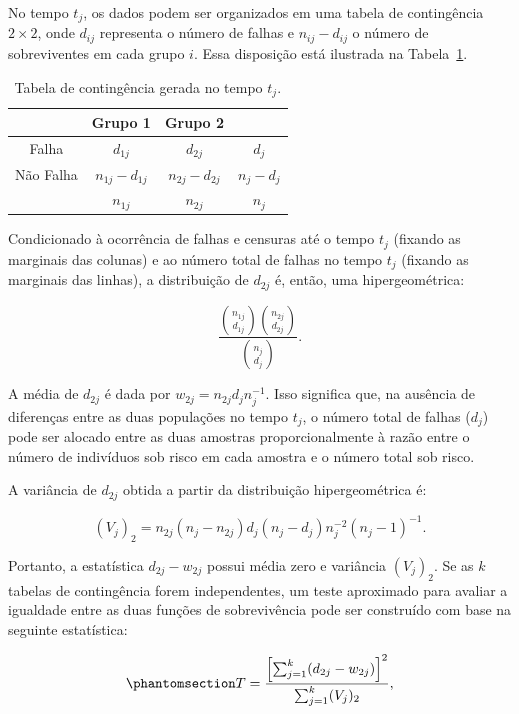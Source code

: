 \documentclass[
  12pt,
  letterpaper,
  DIV=11,
  numbers=noendperiod]{scrreprt}
\begin{document}
No tempo \(t_{j}\), os dados podem ser organizados em uma tabela de
contingência \(2 \times 2\), onde \(d_{ij}\) representa o número de
falhas e \(n_{ij} - d_{ij}\) o número de sobreviventes em cada grupo
\(i\). Essa disposição está ilustrada na
Tabela~\ref{tbl-ExampleTableContig}.

\begin{longtable}[]{@{}cccc@{}}

\caption{\label{tbl-ExampleTableContig}Tabela de contingência gerada no
tempo \(t_{j}\).}

\tabularnewline

\toprule\noalign{}
& Grupo 1 & Grupo 2 & \\
\midrule\noalign{}
\endhead
\bottomrule\noalign{}
\endlastfoot
Falha & \(d_{1j}\) & \(d_{2j}\) & \(d_{j}\) \\
Não Falha & \(n_{1j} - d_{1j}\) & \(n_{2j} - d_{2j}\) &
\(n_{j} - d_{j}\) \\
& \(n_{1j}\) & \(n_{2j}\) & \(n_{j}\) \\

\end{longtable}

Condicionado à ocorrência de falhas e censuras até o tempo \(t_{j}\)
(fixando as marginais das colunas) e ao número total de falhas no tempo
\(t_{j}\) (fixando as marginais das linhas), a distribuição de
\(d_{2j}\) é, então, uma hipergeométrica:

\[
\dfrac{ \binom{ n_{1j} }{ d_{1j} } \binom{ n_{2j} }{ d_{2j} } }{ \binom{ n_{j} }{ d_{j} } }.
\]

A média de \(d_{2j}\) é dada por \(w_{2j} = n_{2j} d_{j} n_{j}^{-1}\).
Isso significa que, na ausência de diferenças entre as duas populações
no tempo \(t_{j}\), o número total de falhas (\(d_{j}\)) pode ser
alocado entre as duas amostras proporcionalmente à razão entre o número
de indivíduos sob risco em cada amostra e o número total sob risco.

A variância de \(d_{2j}\) obtida a partir da distribuição
hipergeométrica é:

\[
(V_{j})_{2} = n_{2j}(n_{j} - n_{2j})d_{j}(n_{j} - d_{j}) n_{j}^{-2} (n_{j} - 1)^{-1}.
\]

Portanto, a estatística \(d_{2j} - w_{2j}\) possui média zero e
variância \((V_{j})_{2}\). Se as \(k\) tabelas de contingência forem
independentes, um teste aproximado para avaliar a igualdade entre as
duas funções de sobrevivência pode ser construído com base na seguinte
estatística:

\begin{equation}\phantomsection\label{eq-EstTestelogrank}{
T = \dfrac{ \left[ \sum_{j = 1}^{k} (d_{2j} - w_{2j}) \right]^{2} }{ \sum_{j = 1}^{k} (V_{j})_{2} },
}\end{equation}
\end{document}
